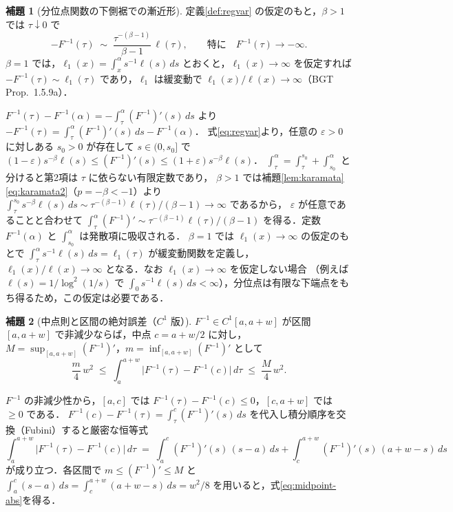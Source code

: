 \documentclass[a4paper,10pt]{jsarticle}
\makeatletter
\theoremstyle{definition}
\newtheorem{lemma}{補題}[section]
\renewenvironment{proof}[1][\proofname]{\par
  \pushQED{\qed}%
  \normalfont \topsep6\p@\@plus6\p@\relax
  \trivlist
  \item[\hskip\labelsep\textbf{#1}]\ignorespaces
}{%
  \popQED\endtrivlist\@endpefalse
}
\renewcommand{\proofname}{証明}
\newcommand{\Finv}{F^{-1}}
\makeatother
\begin{document}
\begin{lemma}[分位点関数の下側裾での漸近形]
\label{lem:tail}
定義\ref{def:regvar} の仮定のもと，$\beta>1$ では $\tau\downarrow0$ で
\begin{equation}
  -\Finv(\tau)\;\sim\;\frac{\tau^{-(\beta-1)}}{\beta-1}\,\ell(\tau),
  \qquad\text{特に}\quad \Finv(\tau)\to-\infty .
  \label{eq:tail}
\end{equation}
$\beta=1$ では，$\ell_1(x)=\int_x^\alpha s^{-1}\ell(s)\,ds$ とおくと，$\ell_1(x)\to\infty$ を仮定すれば $-\Finv(\tau)\sim\ell_1(\tau)$
であり，$\ell_1$ は緩変動で $\ell_1(x)/\ell(x)\to\infty$（BGT Prop.~1.5.9a）．
\end{lemma}
\begin{proof}
$\Finv(\tau)-\Finv(\alpha)=-\int_\tau^\alpha(\Finv)'(s)\,ds$ より
$-\Finv(\tau)=\int_\tau^\alpha(\Finv)'(s)\,ds-\Finv(\alpha)$．
式\eqref{eq:regvar}より，任意の $\varepsilon>0$ に対しある $s_0>0$ が存在して $s\in(0,s_0]$ で $(1-\varepsilon)s^{-\beta}\ell(s)\le(\Finv)'(s)\le(1+\varepsilon)s^{-\beta}\ell(s)$．
$\int_\tau^\alpha=\int_\tau^{s_0}+\int_{s_0}^\alpha$ と分けると第2項は $\tau$ に依らない有限定数であり，
$\beta>1$ では補題\ref{lem:karamata}\eqref{eq:karamata2}（$p=-\beta<-1$）より $\int_\tau^{s_0}s^{-\beta}\ell(s)\,ds\sim\tau^{-(\beta-1)}\ell(\tau)/(\beta-1)\to\infty$ であるから，
$\varepsilon$ が任意であることと合わせて $\int_\tau^\alpha(\Finv)'\sim\tau^{-(\beta-1)}\ell(\tau)/(\beta-1)$ を得る．定数 $\Finv(\alpha)$ と $\int_{s_0}^\alpha$ は発散項に吸収される．
$\beta=1$ では $\ell_1(x)\to\infty$ の仮定のもとで $\int_\tau^\alpha s^{-1}\ell(s)\,ds=\ell_1(\tau)$ が緩変動関数を定義し，
$\ell_1(x)/\ell(x)\to\infty$ となる．なお $\ell_1(x)\to\infty$ を仮定しない場合
（例えば $\ell(s)=1/\log^2(1/s)$ で $\int_0 s^{-1}\ell(s)\,ds<\infty$），分位点は有限な下端点をもち得るため，この仮定は必要である．
\end{proof}

\begin{lemma}[中点則と区間の絶対誤差（$C^1$ 版）]
\label{lem:midpoint}
$\Finv\in C^1[a,a+w]$ が区間 $[a,a+w]$ で非減少ならば，中点 $c=a+w/2$ に対し，$M=\sup_{[a,a+w]}(\Finv)'$，$m=\inf_{[a,a+w]}(\Finv)'$ として
\begin{equation}
  \frac{m}{4}\,w^2
  \;\le\;\int_a^{a+w}\bigl|\Finv(\tau)-\Finv(c)\bigr|\,d\tau
  \;\le\;\frac{M}{4}\,w^2 .
  \label{eq:midpoint-abs}
\end{equation}
\end{lemma}
\begin{proof}
$\Finv$ の非減少性から，$[a,c]$ では $\Finv(\tau)-\Finv(c)\le0$，$[c,a+w]$ では $\ge0$ である．
$\Finv(c)-\Finv(\tau)=\int_\tau^c(\Finv)'(s)\,ds$ を代入し積分順序を交換（Fubini）すると厳密な恒等式
\begin{equation*}
  \int_a^{a+w}\bigl|\Finv(\tau)-\Finv(c)\bigr|\,d\tau
  \;=\;\int_a^{c}(\Finv)'(s)\,(s-a)\,ds+\int_c^{a+w}(\Finv)'(s)\,(a+w-s)\,ds
\end{equation*}
が成り立つ．各区間で $m\le(\Finv)'\le M$ と $\int_a^c(s-a)\,ds=\int_c^{a+w}(a+w-s)\,ds=w^2/8$ を用いると，式\eqref{eq:midpoint-abs}を得る．
\end{proof}
\end{document}
